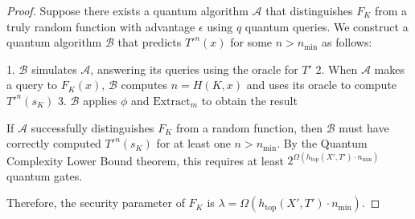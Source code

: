 \documentclass[12pt,a4paper]{article}
\begin{document}
\begin{proof}
Suppose there exists a quantum algorithm $\mathcal{A}$ that distinguishes $F_K$ from a truly random function with advantage $\epsilon$ using $q$ quantum queries. We construct a quantum algorithm $\mathcal{B}$ that predicts $T'^n(x)$ for some $n > n_{\min}$ as follows:

1. $\mathcal{B}$ simulates $\mathcal{A}$, answering its queries using the oracle for $T'$
2. When $\mathcal{A}$ makes a query to $F_K(x)$, $\mathcal{B}$ computes $n = H(K,x)$ and uses its oracle to compute $T'^n(s_K)$
3. $\mathcal{B}$ applies $\phi$ and $\text{Extract}_m$ to obtain the result

If $\mathcal{A}$ successfully distinguishes $F_K$ from a random function, then $\mathcal{B}$ must have correctly computed $T'^n(s_K)$ for at least one $n > n_{\min}$. By the Quantum Complexity Lower Bound theorem, this requires at least $2^{\Omega(h_{\text{top}}(X',T') \cdot n_{\min})}$ quantum gates.

Therefore, the security parameter of $F_K$ is $\lambda = \Omega(h_{\text{top}}(X',T') \cdot n_{\min})$.
\end{proof}
\end{document}
